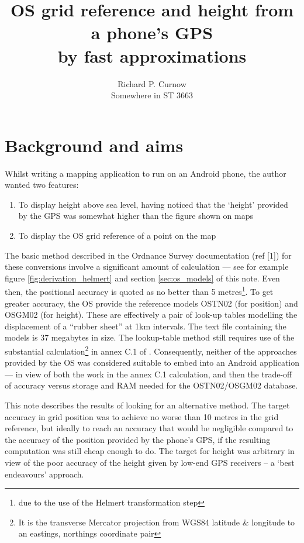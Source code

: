 \documentclass[10pt,a4paper]{article}
\title{OS grid reference and height from a phone's GPS\\by fast approximations}
\author{Richard P. Curnow\\Somewhere in ST 3663}
\begin{document}
\maketitle
\tableofcontents
\clearpage

\section {Background and aims}
Whilst writing a mapping application to run on an Android phone, the author
wanted two features:
\begin{enumerate}
\item To display height above sea level, having noticed that the `height'
provided by the GPS was somewhat higher than the figure shown on maps
\item To display the OS grid reference of a point on the map
\end{enumerate}

The basic method described in the Ordnance Survey documentation (ref [1]) for
these conversions involve a significant amount of calculation --- see for
example figure \ref{fig:derivation_helmert} and section \ref{sec:os_models} of
this note.  Even then, the positional accuracy is quoted as no better than 5
metres\footnote{due to the use of the Helmert transformation step}.  To get
greater accuracy, the OS provide the reference models OSTN02 (for position) and
OSGM02 (for height).  These are effectively a pair of look-up tables modelling
the displacement of a ``rubber sheet'' at 1km intervals.  The text file
containing the models is 37 megabytes in size.  The lookup-table method still
requires use of the substantial calculation\footnote{It is the transverse
Mercator projection from WGS84 latitude \& longitude to an eastings, northings
coordinate pair} in annex C.1 of \cite{gcs}.  Consequently, neither of the
approaches provided by the OS was considered suitable to embed into an Android
application --- in view of both the work in the annex C.1 calculation, and then
the trade-off of accuracy versus storage and RAM needed for the OSTN02/OSGM02
database.

This note describes the results of looking for an alternative method.  The
target accuracy in grid position was to achieve no worse than 10 metres in the
grid reference, but ideally to reach an accuracy that would be negligible
compared to the accuracy of the position provided by the phone's GPS, if the
resulting computation was still cheap enough to do.  The target for height was
arbitrary in view of the poor accuracy of the height given by low-end GPS
receivers -- a `best endeavours' approach.
\end{document}
